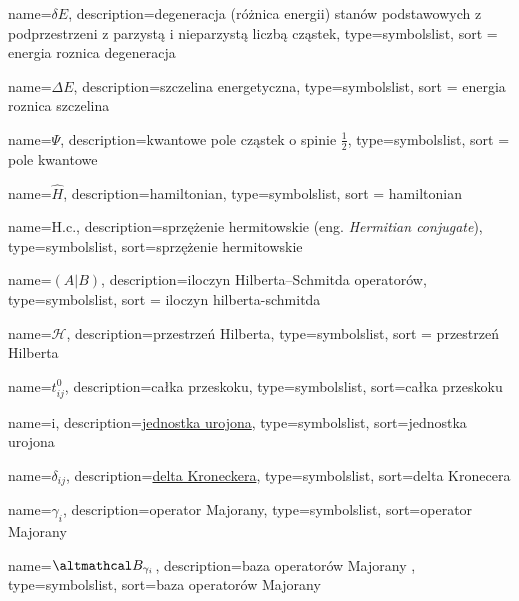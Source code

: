 {
    name=\ensuremath{\delta E},
    description={degeneracja (różnica energii) stanów podstawowych z podprzestrzeni z parzystą i nieparzystą liczbą cząstek},
    type=symbolslist,
    sort = energia roznica degeneracja
}

{
    name=\ensuremath{\Delta E},
    description={szczelina energetyczna},
    type=symbolslist,
    sort = energia roznica szczelina
}

{
    name=\ensuremath{\Psi},
    description={kwantowe pole cząstek o spinie $\tfrac12$},
    type=symbolslist,
    sort = pole kwantowe
}

{
    name=\ensuremath{\hat H},
    description={hamiltonian},
    type=symbolslist,
    sort = hamiltonian
}

{
    name=\ensuremath{\mathrm{H.c.}},
    description={sprzężenie hermitowskie (eng. \textit{Hermitian conjugate})},
    type=symbolslist,
    sort=sprzężenie hermitowskie
}

{
    name=\ensuremath{(A|B)},
    description={iloczyn Hilberta--Schmitda operatorów},
    type=symbolslist,
    sort = iloczyn hilberta-schmitda
}

{
    name=\ensuremath{\mathcal H},
    description={przestrzeń Hilberta},
    type=symbolslist,
    sort = przestrzeń Hilberta
}

{
    name=\ensuremath{t^0_{ij}},
    description={całka przeskoku},
    type=symbolslist,
    sort=całka przeskoku
}

{
    name=\ensuremath{\mathrm{i}},
    description={\href{https://pl.wikipedia.org/wiki/Jednostka_urojona}{jednostka urojona}},
    type=symbolslist,
    sort=jednostka urojona
}

{
    name=\ensuremath{\delta_{ij}},
    description={\href{https://pl.wikipedia.org/wiki/Symbol_Kroneckera}{delta Kroneckera}},
    type=symbolslist,
    sort=delta Kronecera
}

{
    name=\ensuremath{\gamma_i},
    description={operator Majorany},
    type=symbolslist,
    sort=operator Majorany
}

{
    name=\ensuremath{\altmathcal B_{\gamma_i}},
    description={baza operatorów Majorany \gammai},
    type=symbolslist,
    sort=baza operatorów Majorany
}

